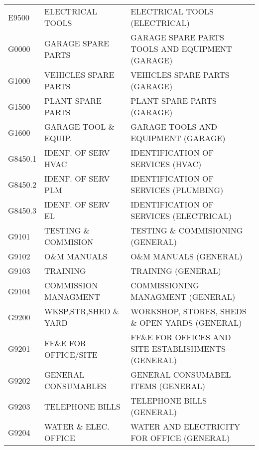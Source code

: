 \begin{longtable}[l]{l%
                  l|%
                  l|}
\rowcolor{thetableheadbgcolor!0.25!white} E9500       & ELECTRICAL TOOLS   & ELECTRICAL TOOLS (ELECTRICAL)   \\
\rowcolor{thetableheadbgcolor!0.25!white} G0000       & GARAGE SPARE PARTS   & GARAGE SPARE PARTS TOOLS AND EQUIPMENT (GARAGE)   \\
\rowcolor{thetableheadbgcolor!0.25!white} G1000       & VEHICLES SPARE PARTS   & VEHICLES SPARE PARTS (GARAGE)   \\
\rowcolor{thetableheadbgcolor!0.25!white} G1500       & PLANT SPARE PARTS   & PLANT SPARE PARTS (GARAGE)   \\
\rowcolor{thetableheadbgcolor!0.25!white} G1600       & GARAGE TOOL \& EQUIP.   & GARAGE TOOLS AND EQUIPMENT (GARAGE)   \\
\rowcolor{thetableheadbgcolor!0.25!white} G8450.1     & IDENF. OF SERV HVAC   & IDENTIFICATION OF SERVICES (HVAC)   \\
\rowcolor{thetableheadbgcolor!0.25!white} G8450.2     & IDENF. OF SERV PLM   & IDENTIFICATION OF SERVICES (PLUMBING)   \\
\rowcolor{thetableheadbgcolor!0.25!white} G8450.3     & IDENF. OF SERV EL   & IDENTIFICATION OF SERVICES (ELECTRICAL)   \\
\rowcolor{thetableheadbgcolor!0.25!white} G9101       & TESTING \& COMMISION   & TESTING \& COMMISIONING (GENERAL)   \\
\rowcolor{thetableheadbgcolor!0.25!white} G9102       & O\&M MANUALS   & O\&M MANUALS (GENERAL)   \\
\rowcolor{thetableheadbgcolor!0.25!white} G9103       & TRAINING   & TRAINING (GENERAL)   \\
\rowcolor{thetableheadbgcolor!0.25!white} G9104       & COMMISSION MANAGMENT   & COMMISSIONING MANAGMENT  (GENERAL)   \\
\rowcolor{thetableheadbgcolor!0.25!white} G9200       & WKSP,STR,SHED \& YARD   & WORKSHOP, STORES, SHEDS \& OPEN YARDS (GENERAL)   \\
\rowcolor{thetableheadbgcolor!0.25!white} G9201       & FF\&E FOR OFFICE/SITE   & FF\&E FOR OFFICES AND SITE ESTABLISHMENTS (GENERAL)   \\
\rowcolor{thetableheadbgcolor!0.25!white} G9202       & GENERAL CONSUMABLES   & GENERAL CONSUMABEL ITEMS (GENERAL)   \\
\rowcolor{thetableheadbgcolor!0.25!white} G9203       & TELEPHONE BILLS   & TELEPHONE BILLS (GENERAL)   \\
\rowcolor{thetableheadbgcolor!0.25!white} G9204       & WATER \& ELEC. OFFICE   & WATER AND ELECTRICITY FOR OFFICE (GENERAL)   \\

\end{longtable}
